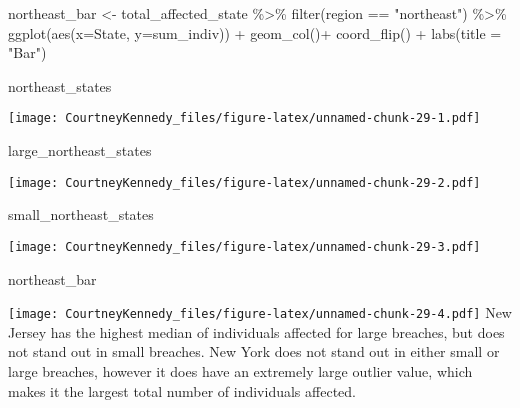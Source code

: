 \documentclass[
]{article}
\newenvironment{Shaded}{\begin{snugshade}}{\end{snugshade}}
\newcommand{\AttributeTok}[1]{\textcolor[rgb]{0.77,0.63,0.00}{#1}}
\newcommand{\FunctionTok}[1]{\textcolor[rgb]{0.00,0.00,0.00}{#1}}
\newcommand{\NormalTok}[1]{#1}
\newcommand{\OtherTok}[1]{\textcolor[rgb]{0.56,0.35,0.01}{#1}}
\newcommand{\SpecialCharTok}[1]{\textcolor[rgb]{0.00,0.00,0.00}{#1}}
\newcommand{\StringTok}[1]{\textcolor[rgb]{0.31,0.60,0.02}{#1}}
\begin{document}
\begin{Shaded}
\begin{Highlighting}[]
\NormalTok{northeast\_bar }\OtherTok{\textless{}{-}}\NormalTok{ total\_affected\_state }\SpecialCharTok{\%\textgreater{}\%}
  \FunctionTok{filter}\NormalTok{(region }\SpecialCharTok{==} \StringTok{"northeast"}\NormalTok{) }\SpecialCharTok{\%\textgreater{}\%}
  \FunctionTok{ggplot}\NormalTok{(}\FunctionTok{aes}\NormalTok{(}\AttributeTok{x=}\NormalTok{State, }\AttributeTok{y=}\NormalTok{sum\_indiv)) }\SpecialCharTok{+}
  \FunctionTok{geom\_col}\NormalTok{()}\SpecialCharTok{+}
  \FunctionTok{coord\_flip}\NormalTok{() }\SpecialCharTok{+}
  \FunctionTok{labs}\NormalTok{(}\AttributeTok{title =} \StringTok{"Bar"}\NormalTok{)}

\NormalTok{northeast\_states}
\end{Highlighting}
\end{Shaded}

\texttt{[image: CourtneyKennedy\_files/figure-latex/unnamed-chunk-29-1.pdf]}

\begin{Shaded}
\begin{Highlighting}[]
\NormalTok{large\_northeast\_states}
\end{Highlighting}
\end{Shaded}

\texttt{[image: CourtneyKennedy\_files/figure-latex/unnamed-chunk-29-2.pdf]}

\begin{Shaded}
\begin{Highlighting}[]
\NormalTok{small\_northeast\_states}
\end{Highlighting}
\end{Shaded}

\texttt{[image: CourtneyKennedy\_files/figure-latex/unnamed-chunk-29-3.pdf]}

\begin{Shaded}
\begin{Highlighting}[]
\NormalTok{northeast\_bar}
\end{Highlighting}
\end{Shaded}

\texttt{[image: CourtneyKennedy\_files/figure-latex/unnamed-chunk-29-4.pdf]}
New Jersey has the highest median of individuals affected for large
breaches, but does not stand out in small breaches. New York does not
stand out in either small or large breaches, however it does have an
extremely large outlier value, which makes it the largest total number
of individuals affected.
\end{document}
